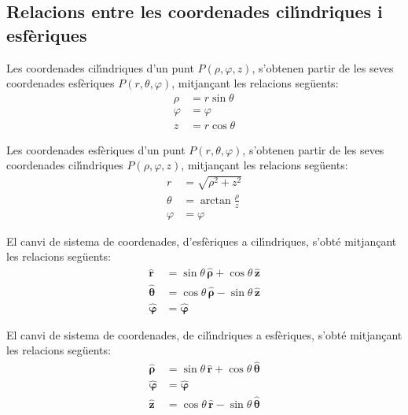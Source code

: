 \documentclass[catalan,a4paper,twoside,11pt]{article}
\begin{document}
\subsection{Relacions entre les coordenades cil\'{\i}ndriques i
esf\`{e}riques}

Les coordenades cil\'{\i}ndriques  d'un punt $P(\rho,\varphi,z)$,
s'obtenen partir de les seves coordenades esf\`{e}riques
$P(r,\theta,\varphi)$, mitjan\c{c}ant les relacions seg\"{u}ents:
\begin{subequations}\begin{align}
    \rho &=r\sin\theta \\ \varphi &=\varphi \\z &=r\cos\theta
\end{align}\end{subequations}

Les coordenades  esf\`{e}riques  d'un punt $P(r,\theta,\varphi)$,
s'obtenen partir de les seves coordenades cil\'{\i}ndriques
$P(\rho,\varphi,z)$, mitjan\c{c}ant les relacions seg\"{u}ents:
\begin{subequations}\begin{align}
    r &=\sqrt{\rho^2+z^2}\\
    \theta &=\arctan\frac{\rho}{z}\\
    \varphi &=\varphi
\end{align}\end{subequations}

El canvi de sistema de coordenades, d'esf\`{e}riques a cil\'{\i}ndriques,
s'obt\'{e} mitjan\c{c}ant les relacions seg\"{u}ents:
\begin{subequations}\begin{align}
    \boldsymbol{\hat{r}} &=\sin\theta\,\boldsymbol{\hat{\rho}}+\cos\theta\,\boldsymbol{\hat{z}}\\
    \boldsymbol{\hat{\theta}}
    &=\cos\theta\,\boldsymbol{\hat{\rho}}-\sin\theta\,\boldsymbol{\hat{z}}\\
    \boldsymbol{\hat{\varphi}}&=\boldsymbol{\hat{\varphi}}
\end{align}\end{subequations}

El canvi de sistema de coordenades, de cil\'{\i}ndriques a esf\`{e}riques,
s'obt\'{e} mitjan\c{c}ant les relacions seg\"{u}ents:
\begin{subequations}\begin{align}
    \boldsymbol{\hat{\rho}} &=\sin\theta\,\boldsymbol{\hat{r}}+
    \cos\theta\,\boldsymbol{\hat{\theta}}\\
    \boldsymbol{\hat{\varphi}}&=\boldsymbol{\hat{\varphi}}\\
    \boldsymbol{\hat{z}} &=\cos\theta\,\boldsymbol{\hat{r}}-
    \sin\theta\,\boldsymbol{\hat{\theta}}
\end{align}\end{subequations}
\end{document}
